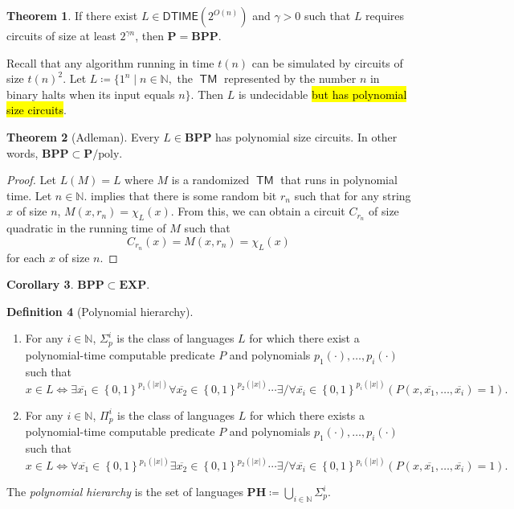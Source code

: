 \documentclass[10pt,letterpaper,cm]{nupset}
\theoremstyle{definition}
\newtheorem{definition}{Definition}[subsection]
\theoremstyle{theorem}
\newtheorem{theorem}[definition]{Theorem}
\newtheorem{corollary}[definition]{Corollary}
\theoremstyle{remark}
\newcommand{\N}{\mathbb N}
\newcommand{\1}{\mathbf{1}}
\newcommand{\0}{\vec 0}
\DeclareMathOperator{\TM}{\mathsf{TM}}
\begin{document}
\begin{theorem}
If there exist $L \in \mathsf{DTIME}(2^{O(n)})$ and $\gamma >0$ such that $L$ requires circuits of size at least $2^{\gamma{n}}$, then $\mathbf{P} = \mathbf{BPP}$.
\end{theorem}

\smallskip

Recall that any algorithm running in time $t(n)$ can be simulated by circuits of size $t(n)^2$. Let $L \coloneqq \{ 1^n \mid n \in \N,$ the $\TM$ represented by the number $n$ in binary halts when its input equals $n\}$. Then $L$ is undecidable \hl{but has polynomial size circuits}. 

\smallskip

\begin{theorem}[Adleman]
Every $L\in \mathbf{BPP}$ has polynomial size circuits. In other words, $\mathbf{BPP} \subset \mathbf{P}/\mathrm{poly}$.
\end{theorem}
\begin{proof}
Let $L(M)  = L$ where $M$ is a randomized $\TM$ that runs in polynomial time. Let $n\in \N$.  implies that there is some random bit $r_n$ such that for any string $x$ of size $n$, $M(x,r_n) = \chi_L(x)$. From this, we can obtain a circuit $C_{r_n}$ of size quadratic in the running time of $M$ such that $$C_{r_n}(x) = M(x,{r_n}) = \chi_L(x)$$ for each $x$ of size $n$.
\end{proof}

\begin{corollary}
$\mathbf{BPP} \subset \mathbf{EXP}$.
\end{corollary}

\begin{definition}[Polynomial hierarchy]  $ $
\begin{enumerate}
\item For any $i \in \N$, $\Sigma_p^i$ is the class of languages $L$ for which there exist a polynomial-time computable predicate $P$ and polynomials $p_1({\cdot}), \ldots, p_i({\cdot})$ such that $$x \in L \iff \exists \overline{x_1}\in \left\{0,1\right\}^{p_1(\lvert{x}\rvert)} \forall \overline{x_2} \in  \left\{0,1\right\}^{p_2(\lvert{x}\rvert)}\cdots \exists /\forall \overline{x_i}\in \left\{0,1\right\}^{p_i(\lvert{x}\rvert)}(P(x, \overline{x_1}, \ldots, \overline{x_i}) =1).$$  
\item For any $i \in \N$, $\Pi_p^i$ is the class of languages $L$ for which there exists a polynomial-time computable predicate $P$ and polynomials $p_1({\cdot}), \ldots, p_i({\cdot})$ such that $$x \in L \iff \forall \overline{x_1}\in \left\{0,1\right\}^{p_1(\lvert{x}\rvert)} \exists \overline{x_2} \in  \left\{0,1\right\}^{p_2(\lvert{x}\rvert)}\cdots \exists /\forall \overline{x_i}\in \left\{0,1\right\}^{p_i(\lvert{x}\rvert)}(P(x, \overline{x_1}, \ldots, \overline{x_i}) =1).$$  
\end{enumerate}
The \textit{polynomial hierarchy} is the set of languages $\mathbf{PH} \coloneqq \bigcup_{i\in \N}\Sigma_p^i$.
\end{definition}
\end{document}
